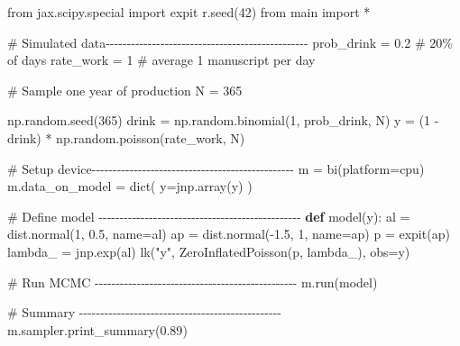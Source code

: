 \documentclass[
  letterpaper,
  DIV=11,
  numbers=noendperiod]{scrreprt}
\newenvironment{Shaded}{\begin{snugshade}}{\end{snugshade}}
\newcommand{\BuiltInTok}[1]{\textcolor[rgb]{0.00,0.23,0.31}{#1}}
\newcommand{\CommentTok}[1]{\textcolor[rgb]{0.37,0.37,0.37}{#1}}
\newcommand{\DecValTok}[1]{\textcolor[rgb]{0.68,0.00,0.00}{#1}}
\newcommand{\FloatTok}[1]{\textcolor[rgb]{0.68,0.00,0.00}{#1}}
\newcommand{\ImportTok}[1]{\textcolor[rgb]{0.00,0.46,0.62}{#1}}
\newcommand{\KeywordTok}[1]{\textcolor[rgb]{0.00,0.23,0.31}{\textbf{#1}}}
\newcommand{\NormalTok}[1]{\textcolor[rgb]{0.00,0.23,0.31}{#1}}
\newcommand{\OperatorTok}[1]{\textcolor[rgb]{0.37,0.37,0.37}{#1}}
\newcommand{\StringTok}[1]{\textcolor[rgb]{0.13,0.47,0.30}{#1}}
\begin{document}
\begin{Shaded}
\begin{Highlighting}[]
\ImportTok{from}\NormalTok{ jax.scipy.special }\ImportTok{import}\NormalTok{ expit}
\NormalTok{r.seed(}\DecValTok{42}\NormalTok{)}
\ImportTok{from}\NormalTok{ main }\ImportTok{import} \OperatorTok{*}

\CommentTok{\# Simulated data{-}{-}{-}{-}{-}{-}{-}{-}{-}{-}{-}{-}{-}{-}{-}{-}{-}{-}{-}{-}{-}{-}{-}{-}{-}{-}{-}{-}{-}{-}{-}{-}{-}{-}{-}{-}{-}{-}{-}{-}{-}{-}{-}{-}{-}{-}{-}{-}}
\NormalTok{prob\_drink }\OperatorTok{=} \FloatTok{0.2}  \CommentTok{\# 20\% of days}
\NormalTok{rate\_work }\OperatorTok{=} \DecValTok{1}     \CommentTok{\# average 1 manuscript per day}

\CommentTok{\# Sample one year of production}
\NormalTok{N }\OperatorTok{=} \DecValTok{365}

\NormalTok{np.random.seed(}\DecValTok{365}\NormalTok{)}
\NormalTok{drink }\OperatorTok{=}\NormalTok{ np.random.binomial(}\DecValTok{1}\NormalTok{, prob\_drink, N)}
\NormalTok{y }\OperatorTok{=}\NormalTok{ (}\DecValTok{1} \OperatorTok{{-}}\NormalTok{ drink) }\OperatorTok{*}\NormalTok{ np.random.poisson(rate\_work, N)}

\CommentTok{\# Setup device{-}{-}{-}{-}{-}{-}{-}{-}{-}{-}{-}{-}{-}{-}{-}{-}{-}{-}{-}{-}{-}{-}{-}{-}{-}{-}{-}{-}{-}{-}{-}{-}{-}{-}{-}{-}{-}{-}{-}{-}{-}{-}{-}{-}{-}{-}{-}{-}}
\NormalTok{m }\OperatorTok{=}\NormalTok{ bi(platform}\OperatorTok{=}\StringTok{\textquotesingle{}cpu\textquotesingle{}}\NormalTok{)}
\NormalTok{m.data\_on\_model }\OperatorTok{=} \BuiltInTok{dict}\NormalTok{(}
\NormalTok{    y}\OperatorTok{=}\NormalTok{jnp.array(y)}
\NormalTok{)}

\CommentTok{\# Define model {-}{-}{-}{-}{-}{-}{-}{-}{-}{-}{-}{-}{-}{-}{-}{-}{-}{-}{-}{-}{-}{-}{-}{-}{-}{-}{-}{-}{-}{-}{-}{-}{-}{-}{-}{-}{-}{-}{-}{-}{-}{-}{-}{-}{-}{-}{-}{-}}
\KeywordTok{def}\NormalTok{ model(y):}
\NormalTok{    al }\OperatorTok{=}\NormalTok{ dist.normal(}\DecValTok{1}\NormalTok{, }\FloatTok{0.5}\NormalTok{, name}\OperatorTok{=}\StringTok{\textquotesingle{}al\textquotesingle{}}\NormalTok{)}
\NormalTok{    ap }\OperatorTok{=}\NormalTok{ dist.normal(}\OperatorTok{{-}}\FloatTok{1.5}\NormalTok{, }\DecValTok{1}\NormalTok{, name}\OperatorTok{=}\StringTok{\textquotesingle{}ap\textquotesingle{}}\NormalTok{)}
\NormalTok{    p }\OperatorTok{=}\NormalTok{ expit(ap)}
\NormalTok{    lambda\_ }\OperatorTok{=}\NormalTok{ jnp.exp(al)}
\NormalTok{    lk(}\StringTok{"y"}\NormalTok{, ZeroInflatedPoisson(p, lambda\_), obs}\OperatorTok{=}\NormalTok{y)}

\CommentTok{\# Run MCMC {-}{-}{-}{-}{-}{-}{-}{-}{-}{-}{-}{-}{-}{-}{-}{-}{-}{-}{-}{-}{-}{-}{-}{-}{-}{-}{-}{-}{-}{-}{-}{-}{-}{-}{-}{-}{-}{-}{-}{-}{-}{-}{-}{-}{-}{-}{-}{-}}
\NormalTok{m.run(model) }

\CommentTok{\# Summary {-}{-}{-}{-}{-}{-}{-}{-}{-}{-}{-}{-}{-}{-}{-}{-}{-}{-}{-}{-}{-}{-}{-}{-}{-}{-}{-}{-}{-}{-}{-}{-}{-}{-}{-}{-}{-}{-}{-}{-}{-}{-}{-}{-}{-}{-}{-}{-}}
\NormalTok{m.sampler.print\_summary(}\FloatTok{0.89}\NormalTok{)}
\end{Highlighting}
\end{Shaded}
\end{document}
